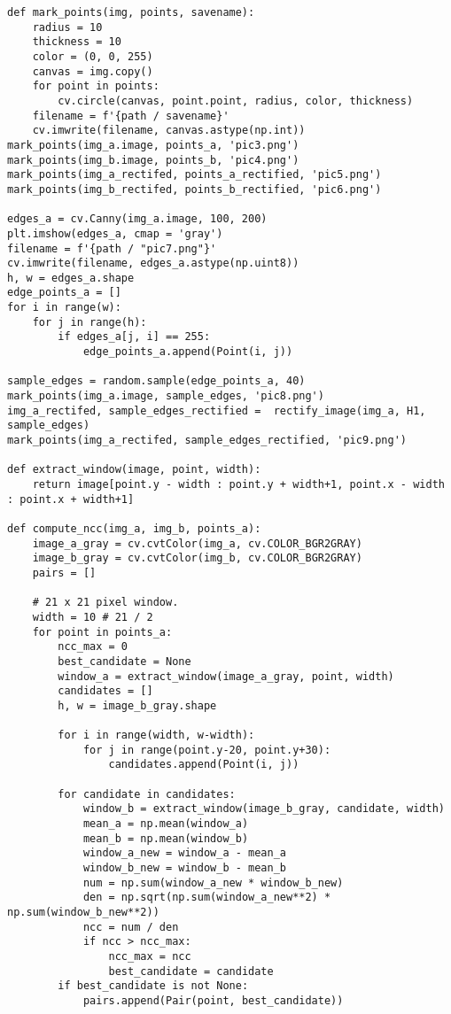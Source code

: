 \documentclass[11pt]{article}
\begin{document}
\begin{lstlisting}
def mark_points(img, points, savename):
    radius = 10
    thickness = 10
    color = (0, 0, 255)
    canvas = img.copy()
    for point in points:
        cv.circle(canvas, point.point, radius, color, thickness)
    filename = f'{path / savename}'
    cv.imwrite(filename, canvas.astype(np.int))
mark_points(img_a.image, points_a, 'pic3.png')
mark_points(img_b.image, points_b, 'pic4.png')
mark_points(img_a_rectifed, points_a_rectified, 'pic5.png')
mark_points(img_b_rectifed, points_b_rectified, 'pic6.png')

edges_a = cv.Canny(img_a.image, 100, 200)
plt.imshow(edges_a, cmap = 'gray')
filename = f'{path / "pic7.png"}'
cv.imwrite(filename, edges_a.astype(np.uint8))
h, w = edges_a.shape
edge_points_a = []
for i in range(w):
    for j in range(h):
        if edges_a[j, i] == 255:
            edge_points_a.append(Point(i, j))

sample_edges = random.sample(edge_points_a, 40)
mark_points(img_a.image, sample_edges, 'pic8.png')
img_a_rectifed, sample_edges_rectified =  rectify_image(img_a, H1, sample_edges)
mark_points(img_a_rectifed, sample_edges_rectified, 'pic9.png')

def extract_window(image, point, width):
    return image[point.y - width : point.y + width+1, point.x - width : point.x + width+1]

def compute_ncc(img_a, img_b, points_a):
    image_a_gray = cv.cvtColor(img_a, cv.COLOR_BGR2GRAY)
    image_b_gray = cv.cvtColor(img_b, cv.COLOR_BGR2GRAY)
    pairs = []

    # 21 x 21 pixel window. 
    width = 10 # 21 / 2
    for point in points_a:
        ncc_max = 0
        best_candidate = None
        window_a = extract_window(image_a_gray, point, width)
        candidates = []
        h, w = image_b_gray.shape

        for i in range(width, w-width):
            for j in range(point.y-20, point.y+30):
                candidates.append(Point(i, j))

        for candidate in candidates:
            window_b = extract_window(image_b_gray, candidate, width)
            mean_a = np.mean(window_a)
            mean_b = np.mean(window_b)
            window_a_new = window_a - mean_a
            window_b_new = window_b - mean_b
            num = np.sum(window_a_new * window_b_new)
            den = np.sqrt(np.sum(window_a_new**2) * np.sum(window_b_new**2))
            ncc = num / den
            if ncc > ncc_max:
                ncc_max = ncc
                best_candidate = candidate
        if best_candidate is not None:
            pairs.append(Pair(point, best_candidate))


\end{lstlisting}
\end{document}

